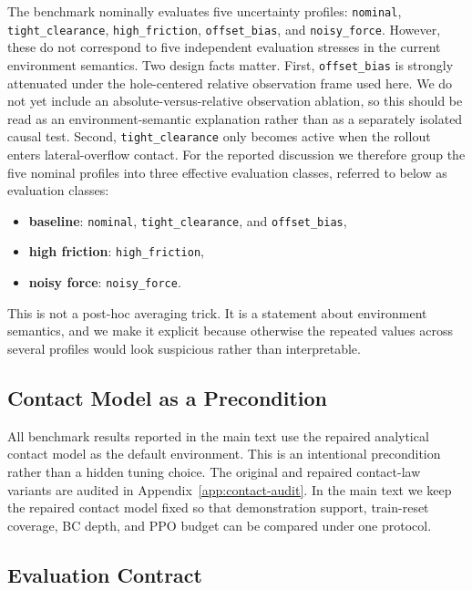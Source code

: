 ﻿\documentclass[11pt]{article}
\newcommand{\code}[1]{\nolinkurl{#1}}
\begin{document}
The benchmark nominally evaluates five uncertainty profiles:
\code{nominal}, \code{tight\_clearance}, \code{high\_friction}, \code{offset\_bias}, and
\code{noisy\_force}. However, these do not correspond to five independent evaluation stresses in the
current environment semantics. Two design facts matter. First, \code{offset\_bias} is strongly
attenuated under the hole-centered relative observation frame used here. We do not yet include an
absolute-versus-relative observation ablation, so this should be read as an environment-semantic
explanation rather than as a separately isolated causal test. Second, \code{tight\_clearance} only
becomes active when the rollout enters lateral-overflow contact. For the reported discussion we
therefore group the five nominal profiles into three effective evaluation classes, referred to
below as evaluation classes:
\begin{itemize}
  \item \textbf{baseline}: \code{nominal}, \code{tight\_clearance}, and \code{offset\_bias},
  \item \textbf{high friction}: \code{high\_friction},
  \item \textbf{noisy force}: \code{noisy\_force}.
\end{itemize}

This is not a post-hoc averaging trick. It is a statement about environment semantics, and we make
it explicit because otherwise the repeated values across several profiles would look suspicious
rather than interpretable.

\subsection{Contact Model as a Precondition}

All benchmark results reported in the main text use the repaired analytical contact model as the default
environment. This is an intentional precondition rather than a hidden tuning choice. The original
and repaired contact-law variants are audited in Appendix~\ref{app:contact-audit}. In the main
text we keep the repaired contact model fixed so that demonstration support, train-reset
coverage, BC depth, and PPO budget can be compared under one protocol.

\subsection{Evaluation Contract}
\end{document}
